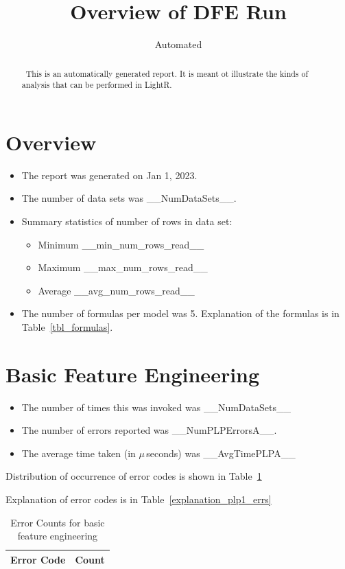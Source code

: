 \documentclass[letterpaper,12pt]{article}
\newcommand{\bi}{\begin{itemize}}
\newcommand{\ei}{\end{itemize}}
\newcommand{\ReportDate}{Jan 1, 2023}
\newcommand{\NumDataSets}{__NumDataSets__}
\newcommand{\NumFormulas}{5}
\newcommand{\MinNumRows}{__min_num_rows_read__}
\newcommand{\MaxNumRows}{__max_num_rows_read__}
\newcommand{\AvgNumRows}{__avg_num_rows_read__}
\newcommand{\NumPLPErrorsA}{__NumPLPErrorsA__}
\newcommand{\AvgTimePLPA}{__AvgTimePLPA__}
\begin{document}
\title{Overview of DFE Run}
\author{Automated}
\maketitle
\thispagestyle{fancy}
\lhead{}
\chead{}
\rhead{}
\cfoot{}
\rfoot{{\small \thepage}}

\begin{abstract}
\ This is an automatically generated report. It is meant ot illustrate the kinds
of analysis that can be performed in LightR.
\end{abstract}

\section{Overview}

\bi
\item The report was generated on \ReportDate. 
\item The number of data sets was \NumDataSets.
\item Summary statistics of number of rows in data set:
  \bi
\item Minimum \MinNumRows
\item Maximum \MaxNumRows
\item Average \AvgNumRows
  \ei
\item The number of formulas per model was \NumFormulas.
  Explanation of the formulas is in Table~\ref{tbl_formulas}.
  \ei

\section{Basic Feature Engineering}
\label{PLP1}
\bi
\item The number of times this was invoked was \NumDataSets
\item The number of errors reported was \NumPLPErrorsA.
\item The average time taken (in \(\mu\,\)seconds) was \AvgTimePLPA
\ei

Distribution of occurrence of error codes is shown in Table~\ref{plp1_errs}

Explanation of error codes is in Table~\ref{explanation_plp1_errs}
\begin{table}
  \centering
  \begin{tabular}{|l|l|} \hline \hline
    {\bf Error Code} & {\bf Count} \\ \hline 
     
    \hline
  \end{tabular}
  \caption{Error Counts for basic feature engineering}
  \label{plp1_errs}
\end{table}
\end{document}
